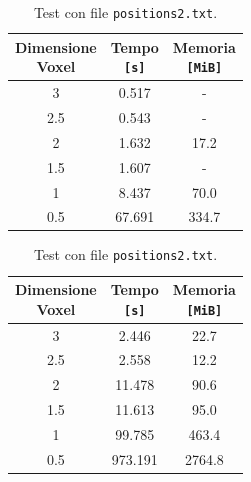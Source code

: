 \begin{center}
  \begin{table}[h]
    \begin{minipage}{.5\linewidth}
      \vspace{0pt}
      \centering
      \begin{tabular}{ccc}
        \toprule
          \shortstack{Dimensione\\ Voxel} & \shortstack{Tempo \\\texttt{[s]}} & \shortstack{Memoria \\\texttt{[MiB]}}\\
        \midrule
          3   & 0.517  & -     \\
          2.5 & 0.543  & -     \\
          2   & 1.632  & 17.2  \\
          1.5 & 1.607  & -     \\
          1   & 8.437  & 70.0  \\
          0.5 & 67.691 & 334.7 \\
        \bottomrule
      \end{tabular}
      \caption{Test con file \texttt{positions.txt}.}
      \label{tab:positionsnone}
    \end{minipage}
    \begin{minipage}{.5\linewidth}
      \vspace{0pt}\raggedright
      \centering
      \begin{tabular}{ccc}
        \toprule
          \shortstack{Dimensione\\ Voxel} & \shortstack{Tempo \\\texttt{[s]}} & \shortstack{Memoria \\\texttt{[MiB]}}\\
        \midrule
          3   & 2.446   & 22.7   \\
          2.5 & 2.558   & 12.2   \\
          2   & 11.478  & 90.6   \\
          1.5 & 11.613  & 95.0   \\
          1   & 99.785  & 463.4  \\
          0.5 & 973.191 & 2764.8 \\
        \bottomrule
      \end{tabular}
      \caption{Test con file \texttt{positions2.txt}.}
      \label{tab:positions2none}
    \end{minipage}
  \end{table}
\end{center}

